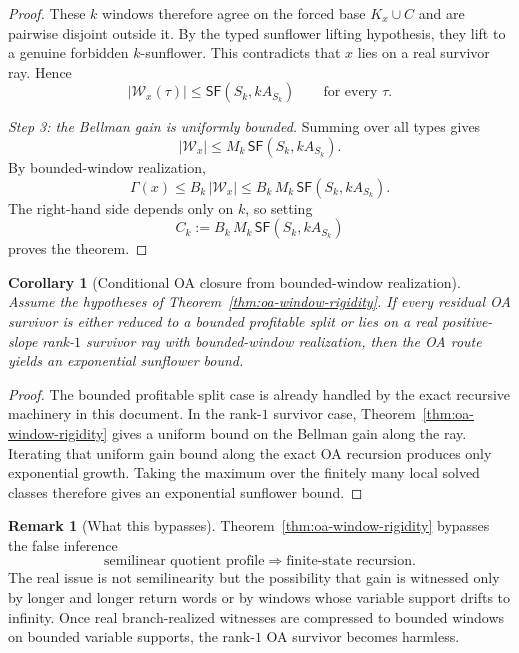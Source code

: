 \documentclass[11pt]{article}
\newtheorem{corollary}[theorem]{Corollary}
\theoremstyle{definition}
\newtheorem{remark}[theorem]{Remark}
\newcommand{\1}{\mathbf{1}}
\begin{document}
\begin{proof}
These $k$ windows therefore agree on the forced base $K_x\cup C$ and are pairwise disjoint outside it. By the typed sunflower lifting hypothesis, they lift to a genuine forbidden $k$-sunflower. This contradicts that $x$ lies on a real survivor ray. Hence
\[
|\mathcal W_x(\tau)|\le \mathsf{SF}(S_k,kA_{S_k})
\qquad\text{for every }\tau.
\]

\emph{Step 3: the Bellman gain is uniformly bounded.}
Summing over all types gives
\[
|\mathcal W_x|
\le
M_k\,\mathsf{SF}(S_k,kA_{S_k}).
\]
By bounded-window realization,
\[
\Gamma(x)\le B_k\,|\mathcal W_x|
\le
B_k\,M_k\,\mathsf{SF}(S_k,kA_{S_k}).
\]
The right-hand side depends only on $k$, so setting
\[
C_k:=B_k\,M_k\,\mathsf{SF}(S_k,kA_{S_k})
\]
proves the theorem.
\end{proof}

\begin{corollary}[Conditional OA closure from bounded-window realization]\label{cor:oa-window-exp}
Assume the hypotheses of Theorem~\ref{thm:oa-window-rigidity}. If every residual OA survivor is either reduced to a bounded profitable split or lies on a real positive-slope rank-$1$ survivor ray with bounded-window realization, then the OA route yields an exponential sunflower bound.
\end{corollary}

\begin{proof}
The bounded profitable split case is already handled by the exact recursive machinery in this document. In the rank-$1$ survivor case, Theorem~\ref{thm:oa-window-rigidity} gives a uniform bound on the Bellman gain along the ray. Iterating that uniform gain bound along the exact OA recursion produces only exponential growth. Taking the maximum over the finitely many local solved classes therefore gives an exponential sunflower bound.
\end{proof}

\begin{remark}[What this bypasses]\label{rem:oa-window-bypass}
Theorem~\ref{thm:oa-window-rigidity} bypasses the false inference
\[
\text{semilinear quotient profile}
\Longrightarrow
\text{finite-state recursion}.
\]
The real issue is not semilinearity but the possibility that gain is witnessed only by longer and longer return words or by windows whose variable support drifts to infinity. Once real branch-realized witnesses are compressed to bounded windows on bounded variable supports, the rank-$1$ OA survivor becomes harmless.
\end{remark}
\end{document}
